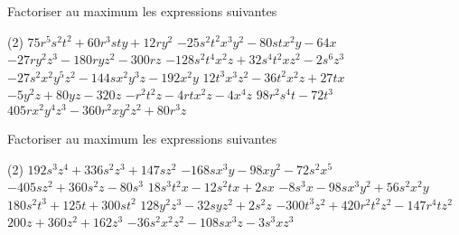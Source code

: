 \documentclass[a4paper,12pt]{report}
\begin{document}
\begin{auto}Factoriser au maximum les expressions suivantes

\begin{tasks}(2)
	\task $75 r^5 s^2 t^2 + 60 r^3 s t y + 12 r y^2$
	\task $-25 s^2 t^2 x^3 y^2-80 s t x^2 y-64 x$
	\task $-27 r y^2 z^3-180 r y z^2-300 r z$
	\task $-128 s^2 t^4 x^2 z + 32 s^4 t^2 x z^2-2 s^6 z^3$
	\task $-27 s^2 x^2 y^5 z^2-144 s x^2 y^3 z-192 x^2 y$
	\task $12 t^3 x^3 z^2-36 t^2 x^2 z + 27 t x$
	\task $-5 y^2 z + 80 y z-320 z$
	\task $-r^2 t^2 z-4 r t x^2 z-4 x^4 z$
	\task $98 r^2 s^4 t-72 t^3$
	\task $405 r x^2 y^4 z^3-360 r^2 x y^2 z^2 + 80 r^3 z$
\end{tasks}
\end{auto}

\begin{auto}Factoriser au maximum les expressions suivantes

\begin{tasks}(2)
	\task $192 s^3 z^4 + 336 s^2 z^3 + 147 s z^2$
	\task $-168 s x^3 y-98 x y^2-72 s^2 x^5$
	\task $-405 s z^2 + 360 s^2 z-80 s^3$
	\task $18 s^3 t^2 x-12 s^2 t x + 2 s x$
	\task $-8 s^3 x-98 s x^3 y^2 + 56 s^2 x^2 y$
	\task $180 s^2 t^3 + 125 t + 300 s t^2$
	\task $128 y^2 z^3-32 s y z^2 + 2 s^2 z$
	\task $-300 t^3 z^2 + 420 r^2 t^2 z^2-147 r^4 t z^2$
	\task $200 z + 360 z^2 + 162 z^3$
	\task $-36 s^2 x^2 z^2-108 s x^3 z-3 s^3 x z^3$
\end{tasks}
\end{auto}
\end{document}

